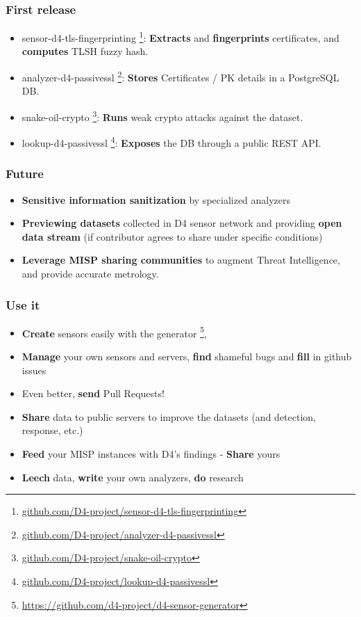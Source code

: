 \documentclass{beamer}
\begin{document}
\begin{frame}
  \frametitle{First release}
  \begin{itemize}
  \item[\checkmark] sensor-d4-tls-fingerprinting
    \footnote{\url{github.com/D4-project/sensor-d4-tls-fingerprinting}}:
    {\bf Extracts} and {\bf fingerprints} certificates, and {\bf computes} TLSH fuzzy hash.
  \item[\checkmark] analyzer-d4-passivessl
    \footnote{\url{github.com/D4-project/analyzer-d4-passivessl}}:
    {\bf Stores} Certificates / PK details in a PostgreSQL DB.
  \item snake-oil-crypto 
    \footnote{\url{github.com/D4-project/snake-oil-crypto}}:
    {\bf Runs} weak crypto attacks against the dataset.
  \item lookup-d4-passivessl
    \footnote{\url{github.com/D4-project/lookup-d4-passivessl}}:
    {\bf Exposes} the DB through a public REST API.
  \end{itemize}
\end{frame}

\begin{frame}
  \frametitle{Future}
     \begin{itemize}
     \item {\bf Sensitive information sanitization} by specialized analyzers 
     \item {\bf Previewing datasets} collected in D4 sensor network and providing {\bf open data stream} (if contributor agrees to share under specific conditions)
     \item {\bf Leverage MISP sharing communities} to augment Threat
       Intelligence, and provide accurate metrology. 
\end{itemize}
\end{frame}

\begin{frame}
\frametitle{Use it}
\begin{itemize}
\item {\bf Create} sensors easily with the generator \footnote{\url{https://github.com/d4-project/d4-sensor-generator}},
\item {\bf Manage} your own sensors and servers, {\bf find} shameful bugs and
  {\bf fill} in github issues
\item Even better, {\bf send} Pull Requests! 
\item {\bf Share} data to public servers to improve the datasets (and detection,
  response, etc.)
\item {\bf Feed} your MISP instances with D4's findings - {\bf Share} yours
\item {\bf Leech} data, {\bf write} your own analyzers, {\bf do} research
\end{itemize}
\end{frame}
\end{document}
